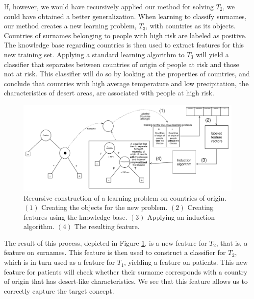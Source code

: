 \documentclass[letterpaper]{article} %
\theoremstyle{definition}
\begin{document}
If, however, we would have recursively applied our method for solving $T_2$, we could have obtained a better generalization.
When learning to classify surnames, our method creates a new learning problem, $T_3$, with countries as its objects. Countries of surnames belonging to people with high risk are labeled as positive. The knowledge base regarding countries is then used to extract features for this new training set.
Applying a standard learning algorithm to $T_3$ will yield a classifier that separates between countries of origin of people at risk and those not at risk. This classifier will do so by looking at the properties of countries, and conclude that countries with high average temperature and low precipitation, the characteristics of desert areas, are associated with people at high risk.

\begin{figure}[th]
	\centering
	\includegraphics[width=0.9\linewidth,height=0.35\linewidth]{fig4_annotated.pdf}
	\caption{Recursive construction of a learning problem on countries of origin. $(1)$ Creating the objects for the new problem. $(2)$ Creating features using the knowledge base. $(3)$ Applying an induction algorithm. $(4)$ The resulting feature.}
	\label{fig:moving_to_lvl2}
\end{figure}

The result of this process, depicted in Figure \ref{fig:moving_to_lvl2}, is a new feature for $T_2$, that is, a feature on surnames. This feature is then used to construct a classifier for $T_2$, which is in turn used as a feature for $T_1$, yielding a feature on patients. This new feature for patients will check whether their surname corresponds with a country of origin that has desert-like characteristics. We see that this feature allows us to correctly capture the target concept.


\end{document}

